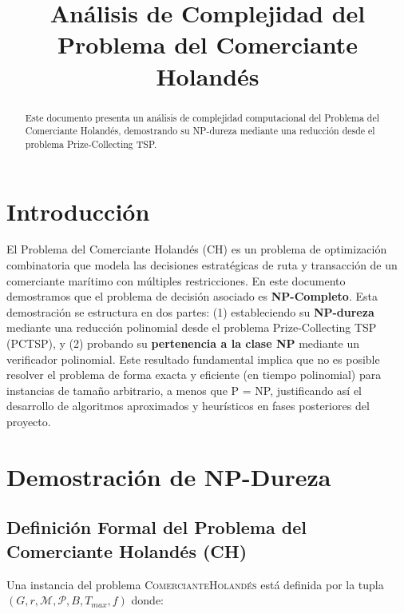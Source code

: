 \documentclass{article}
\title{Análisis de Complejidad del Problema del Comerciante Holandés}
\author{}
\date{}
\begin{document}
\maketitle

\begin{abstract}
Este documento presenta un análisis de complejidad computacional del Problema del Comerciante Holandés, demostrando su NP-dureza mediante una reducción desde el problema Prize-Collecting TSP.
\end{abstract}

\section{Introducción}
\label{sec:introduccion}

El Problema del Comerciante Holandés (CH) es un problema de optimización combinatoria que modela las decisiones estratégicas de ruta y transacción de un comerciante marítimo con múltiples restricciones. En este documento demostramos que el problema de decisión asociado es \textbf{NP-Completo}. Esta demostración se estructura en dos partes: (1) estableciendo su \textbf{NP-dureza} mediante una reducción polinomial desde el problema Prize-Collecting TSP (PCTSP), y (2) probando su \textbf{pertenencia a la clase NP} mediante un verificador polinomial. Este resultado fundamental implica que no es posible resolver el problema de forma exacta y eficiente (en tiempo polinomial) para instancias de tamaño arbitrario, a menos que P = NP, justificando así el desarrollo de algoritmos aproximados y heurísticos en fases posteriores del proyecto.

\section{Demostración de NP-Dureza} 
\label{sec:np-hardness}

\subsection{Definición Formal del Problema del Comerciante Holandés (CH)}
\label{subsec:def_ch}

Una instancia del problema \textsc{ComercianteHolandés} está definida por la tupla $(G, r, \mathcal{M}, \mathcal{P}, B, T_{max}, f)$ donde:
\end{document}
